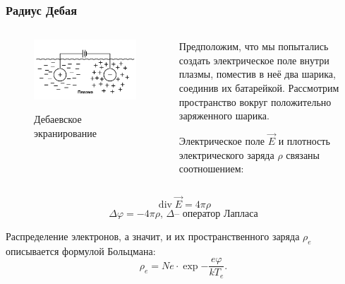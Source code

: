 \documentclass[10pt,pdf,hyperref={unicode}, dvipsnames]{beamer}
\renewcommand{\phi}{\varphi}
\renewcommand{\div}{\operatorname{div}}
\begin{document}
\begin{frame}[t]\frametitle{Радиус Дебая}
\begin{minipage}[0.5\textheight]{\textwidth}
	\vspace{0.5cm}
	\begin{columns}[T]

		\begin{column}{0.4\textwidth}
			\begin{figure}[tb]
				\vspace{0pt}
				\centering
				\includegraphics[width=\textwidth]{fig/debai}
				\label{fig:debai}
				\vspace{-20pt}

				\caption*{Дебаевское экранирование}

			\end{figure}
		\end{column}


		\begin{column}{0.6\textwidth}
			Предположим, что мы попытались создать электрическое поле внутри плазмы, поместив в неё два шарика, соединив их батарейкой. Рассмотрим пространство вокруг положительно заряженного  шарика.

			Электрическое поле $\vec{E}$ и плотность электрического заряда $\rho$ связаны соотношением:

		\end{column}
	\end{columns}
\end{minipage}

\begin{equation}
	\div{\vec{E}}=4\pi \rho
\end{equation}
\begin{equation}
	\Delta\phi= -4\pi\rho,\, \Delta \text{-- оператор Лапласа}
\end{equation}

	Распределение электронов,
	а значит, и их пространственного заряда
$\rho_e$ описывается формулой Больцмана:
\begin{equation}
	\rho_e= Ne\cdot \exp{-\frac{e\phi}{kT_e}}.
\end{equation}



\end{frame}
\end{document}
